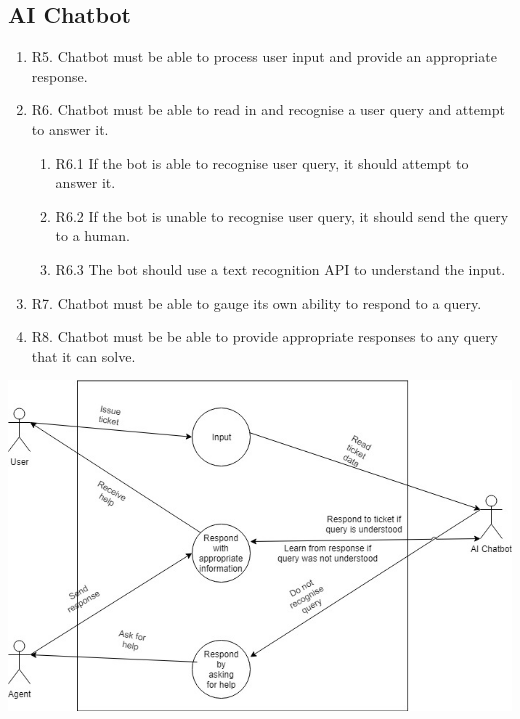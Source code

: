 \documentclass[11pt]{article}
\begin{document}
\subsection{AI Chatbot}
\begin{enumerate}
    \item R5. Chatbot must be able to process user input and provide an appropriate response.
    \item R6. Chatbot must be able to read in and recognise a user query and attempt to answer it.
    \begin{enumerate}
        \item R6.1 If the bot is able to recognise user query, it should attempt to answer it.
        \item R6.2 If the bot is unable to recognise user query, it should send the query to a human.
        \item R6.3 The bot should use a text recognition API to understand the input.
    \end{enumerate}
    \item R7. Chatbot must be able to gauge its own ability to respond to a query.
    \item R8. Chatbot must be be able to provide appropriate responses to any query that it can solve.
\end{enumerate}
\includegraphics[width=1.0\textwidth]{../../images/AI_Chatbot_UCD.jpg}
\end{document}
